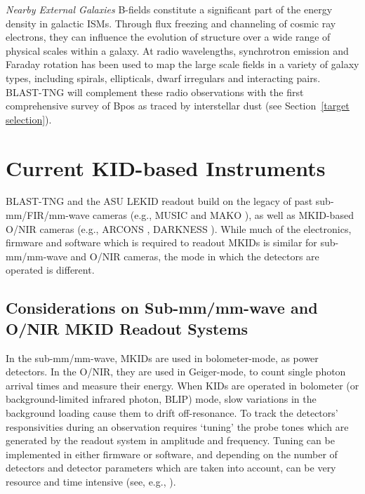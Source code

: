 \vspace{5mm}

\textit{Nearby External Galaxies} B-fields constitute a significant part of the energy density in galactic ISMs. Through flux freezing and channeling of cosmic ray electrons, they can influence the evolution of structure over a wide range of physical scales within a galaxy. At radio wavelengths, synchrotron emission and Faraday rotation has been used to map the large scale fields in a variety of galaxy types, including spirals, ellipticals, dwarf irregulars and interacting pairs. BLAST-TNG will complement these radio observations with the first comprehensive survey of \gls{Bpos} as traced by interstellar dust (see Section~\ref{target selection}).

\section{Current KID-based Instruments}\label{kid cameras}

BLAST-TNG and the ASU LEKID readout build on the legacy of past sub-mm/FIR/mm-wave cameras (e.g., MUSIC \citep{golwala2012status} and MAKO \citep{swenson2012mako}), as well as MKID-based O/NIR cameras (e.g., ARCONS \citep{mazin2013arcons}, DARKNESS \citep{meeker2018darkness,strader2016digitial}). While much of the electronics, firmware and software which is required to readout MKIDs is similar for sub-mm/mm-wave and O/NIR cameras, the mode in which the detectors are operated is different.

\subsection{Considerations on Sub-mm/mm-wave and O/NIR MKID Readout Systems}\label{onir_systems}

In the sub-mm/mm-wave, MKIDs are used in bolometer-mode, as power detectors. In the O/NIR, they are used in Geiger-mode, to count single photon arrival times and measure their energy. When KIDs are operated in bolometer (or background-limited infrared photon, BLIP) mode, slow variations in the background loading cause them to drift off-resonance. To track the detectors' responsivities during an observation requires `tuning' the probe tones which are generated by the readout system in amplitude and frequency. Tuning can be implemented in either firmware or software, and depending on the number of detectors and detector parameters which are taken into account, can be very resource and time intensive (see, e.g., \citet{dodkins2018mkid}).


